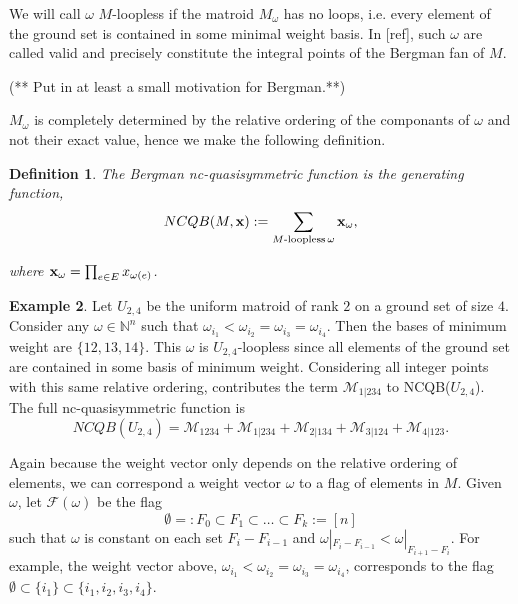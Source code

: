 \documentclass[12pt,reqno]{amsart}
\newtheorem{definition}{Definition}
\numberwithin{definition}{section}
\theoremstyle{definition}
\newtheorem{example}[definition]{Example}
\newcommand{\om}{\omega}
\newcommand{\ncM}{\mathcal{M}}
\begin{document}
  We will call $\omega$ $M$-loopless if the matroid $M_{\omega}$ has
  no loops, i.e.  every element of the ground set is contained in
  some minimal weight basis.  In [ref], such $\omega$ are called 
    valid and precisely constitute the integral points of the Bergman
  fan of $M$.

 (** Put in at least a small motivation for Bergman.**)

$M_{\omega}$ is completely determined by the
relative ordering of the componants of $\omega$ and not their exact
value, hence we make the following definition.


\begin{definition}
The Bergman nc-quasisymmetric function is the generating function,
$$NCQB(M,{\bf x}) := \sum_{M\textrm{-loopless} \, \omega} {\bf x}_{\omega},$$

where ${\bf x}_{\omega} = \prod_{e \in E} x_{\omega(e)}$.
\end{definition}


\begin{example}

Let $U_{2,4}$ be the uniform matroid of rank $2$ on a ground set of
size $4$.  Consider any $\omega \in \mathbb{N}^n$ such that
$\omega_{i_1} < \omega_{i_2} = \omega_{i_3} = \omega_{i_4}$.  Then the
bases of minimum weight are $\{12, 13, 14\}$.  This $\omega$ is
$U_{2,4}$-loopless since all elements of the ground set are contained
in some basis of minimum weight.  Considering all integer points with this same relative ordering,  contributes the term
${\ncM}_{1|234}$ to NCQB($U_{2,4}$).  The full nc-quasisymmetric function
is
$$NCQB(U_{2,4})  = {\ncM}_{1234} + {\ncM}_{1|234} + {\ncM}_{2|134} + {\ncM}_{3|124} + {\ncM}_{4|123}. $$

\end{example}


Again because the weight vector only depends on the relative ordering
of elements, we can correspond a weight vector $\om$ to a flag of
elements in $M$.  Given $\om$, let $\mathcal{F}(\om)$ be the flag
$$\emptyset =: F_0 \subset F_1 \subset \ldots \subset F_k := [n]$$
such that $\om$ is constant on each set $F_i - F_{i-1}$ and $\om|_{F_i -
  F_{i-1}} < \om|_{F_{i+1} - F_{i}} $.  For example, the weight vector
above, $\om_{i_1} < \om_{i_2} = \om_{i_3} = \om_{i_4}$, corresponds to
the flag ${\emptyset \subset \{i_1\} \subset \{i_1,i_2,i_3,i_4\}}$.
\end{document}
